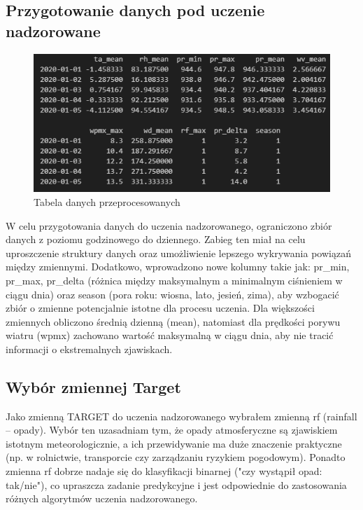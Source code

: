 \documentclass[10pt,a4paper]{article}
\begin{document}
\subsection*{Przygotowanie danych pod uczenie nadzorowane}
\begin{figure}[h]
	\centering
	\includegraphics[scale=1]{df_prepare.png}
	\caption{Tabela danych przeprocesowanych}
	\label{fig:my_label}
\end{figure}
\noindent W celu przygotowania danych do uczenia nadzorowanego, ograniczono zbiór danych z poziomu godzinowego do dziennego. Zabieg ten miał na celu uproszczenie struktury danych oraz umożliwienie lepszego wykrywania powiązań między zmiennymi. Dodatkowo, wprowadzono nowe kolumny takie jak: pr\_min, pr\_max, pr\_delta (różnica między maksymalnym a minimalnym ciśnieniem w ciągu dnia) oraz season (pora roku: wiosna, lato, jesień, zima), aby wzbogacić zbiór o zmienne potencjalnie istotne dla procesu uczenia. Dla większości zmiennych obliczono średnią dzienną (mean), natomiast dla prędkości porywu wiatru (wpmx) zachowano wartość maksymalną w ciągu dnia, aby nie tracić informacji o ekstremalnych zjawiskach.

\subsection*{Wybór zmiennej Target}
\noindent Jako zmienną TARGET do uczenia nadzorowanego wybrałem zmienną rf (rainfall – opady). Wybór ten uzasadniam tym, że opady atmosferyczne są zjawiskiem istotnym meteorologicznie, a ich przewidywanie ma duże znaczenie praktyczne (np. w rolnictwie, transporcie czy zarządzaniu ryzykiem pogodowym). Ponadto zmienna rf dobrze nadaje się do klasyfikacji binarnej ("czy wystąpił opad: tak/nie"), co upraszcza zadanie predykcyjne i jest odpowiednie do zastosowania różnych algorytmów uczenia nadzorowanego.
\end{document}
